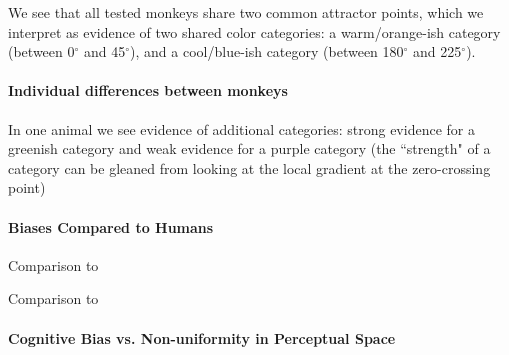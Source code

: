 We see that all tested monkeys share two common attractor points, which we interpret as evidence of two shared color categories: a warm/orange-ish category (between 0$^\circ$ and 45$^\circ$), and a cool/blue-ish category (between 180$^\circ$ and 225$^\circ$).

\paragraph{Individual differences between monkeys}

In one animal we see evidence of additional categories: strong evidence for a greenish category and weak evidence for a purple category (the ``strength" of a category can be gleaned from looking at the local gradient at the zero-crossing point)



\paragraph{Biases Compared to Humans}

Comparison to \cite{bae_why_2015}

Comparison to \cite{panichello_error-correcting_2019}

\paragraph{Cognitive Bias vs. Non-uniformity in Perceptual Space}

